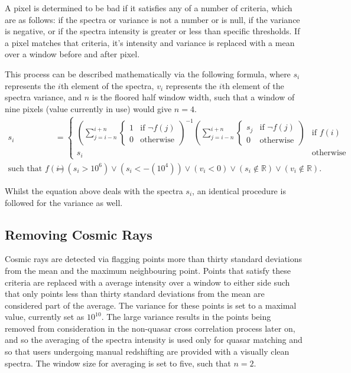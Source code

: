 \documentclass[titlesmallcaps, examinerscopy, copyrightpage]{uqthesis}
\newcommand{\brac}[1]{\left( #1 \right)}
\begin{document}
A pixel is determined to be bad if it satisfies any of a number of criteria, which are as follows: if the spectra or variance is not a number or is null, if the variance is negative, or if the spectra intensity is greater or less than specific thresholds. If a pixel matches that criteria, it's intensity and variance is replaced with a mean over a window before and after pixel.

This process can be described mathematically via the following formula, where $s_i$ represents the $i$th element of the spectra, $v_i$ represents the $i$th element of the spectra variance, and $n$ is the floored half window width, such that a window of nine pixels (value currently in use) would give $n=4$.
\begin{align}
s_i &= 
\begin{cases}
	\brac{\sum\limits_{j=i-n}^{i+n} \begin{cases}1 & \text{if } \lnot f(j) \\ 0 & \text{otherwise} \end{cases}}^{-1}\brac{\sum\limits_{j=i-n}^{i+n} \begin{cases}s_j & \text{if } \lnot f(j) \\ 0 & \text{otherwise} \end{cases}} & \text{if } f(i) \\
	s_i & \text{otherwise}
\end{cases}\\
\text{such that } f(i) &= \brac{s_i > 10^6} \vee \brac{s_i <  -\left(10^4\right)} \vee \brac{v_i < 0} \vee \brac{s_i \notin \mathbb{R}} \vee \brac{v_i \notin \mathbb{R}}.
\end{align} 

Whilst the equation above deals with the spectra $s_i$, an identical procedure is followed for the variance as well.

\pagebreak
\subsection{Removing Cosmic Rays}

Cosmic rays are detected via flagging points more than thirty standard deviations from the mean and the maximum neighbouring point. Points that satisfy these criteria are replaced with a average intensity over a window to either side such that only points less than thirty standard deviations from the mean are considered part of the average. The variance for these points is set to a maximal value, currently set as $10^{10}$. The large variance results in the points being removed from consideration in the non-quasar cross correlation process later on, and so the averaging of the spectra intensity is used only for quasar matching and so that users undergoing manual redshifting are provided with a visually clean spectra. The window size for averaging is set to five, such that $n = 2$.
\end{document}
